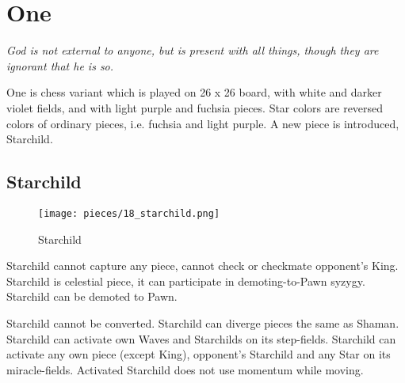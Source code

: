 

\chapter*{One}
\label{ch:One}

\begin{flushright}
\parbox{0.8\textwidth}{
\emph{God is not external to anyone, but is present with all things, though
they are ignorant that he is so.\newline
{} } }
\end{flushright}

\noindent
One is chess variant which is played on 26 x 26 board, with white and
darker violet fields, and with light purple and fuchsia pieces. Star
colors are reversed colors of ordinary pieces, i.e. fuchsia and light
purple. A new piece is introduced, Starchild.

\clearpage %

\section*{Starchild}
\label{sec:One/Starchild}

\vspace*{-0.8\baselineskip}
\noindent
\begin{wrapfigure}[11]{l}{0.4\textwidth}
\centering
\texttt{[image: pieces/18\_starchild.png]}
\caption{Starchild}
\label{fig:18_starchild}
\end{wrapfigure}
Starchild cannot capture any piece, cannot check or checkmate opponent's King.
Starchild is celestial piece, it can participate in demoting-to-Pawn syzygy.
Starchild can be demoted to Pawn.

Starchild cannot be converted. Starchild can diverge pieces the same as Shaman.
Starchild can activate own Waves and Starchilds on its step-fields. Starchild can
activate any own piece (except King), opponent's Starchild and any Star on its
miracle-fields. Activated Starchild does not use momentum while moving.

